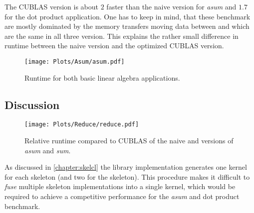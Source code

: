 The CUBLAS version is about $2$ faster than the naive \OpenCL version for \emph{asum} and $1.7$ for the dot product application.
One has to keep in mind, that these benchmark are mostly dominated by the memory transfers moving data between \CPU and \GPU which are the same in all three version.
This explains the rather small difference in runtime between the naive \OpenCL version and the optimized CUBLAS version.

\begin{figure}[tb]
  \centering
  \texttt{[image: Plots/Asum/asum.pdf]}
  \caption{Runtime for both basic linear algebra applications.}
  \label{fig:skelcl:asum:dot}
\end{figure}

\subsection*{Discussion}

\begin{figure}[tb]
  \centering
  \texttt{[image: Plots/Reduce/reduce.pdf]}
  \caption{Relative runtime compared to CUBLAS of the naive \OpenCL and \SkelCL versions of \emph{asum} and \emph{sum}.}
  \label{fig:skelcl:reduce}
\end{figure}
As discussed in \autoref{chapter:skelcl} the \SkelCL library implementation generates one \OpenCL kernel for each skeleton (and two for the \reduce skeleton).
This procedure makes it difficult to \emph{fuse} multiple skeleton implementations into a single \OpenCL kernel, which would be required to achieve a competitive performance for the \emph{asum} and dot product benchmark.

